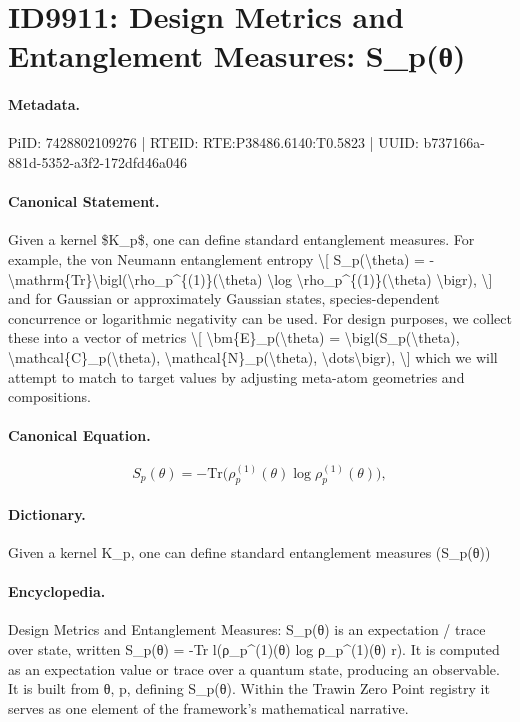 \section*{ID9911: Design Metrics and Entanglement Measures: S\_p(θ)}
\paragraph{Metadata.}
PiID: 7428802109276 | RTEID: RTE:P38486.6140:T0.5823 | UUID: b737166a-881d-5352-a3f2-172dfd46a046

\paragraph{Canonical Statement.}
Given a kernel \$K\_p\$, one can define standard entanglement measures. For example, the von Neumann entanglement entropy \textbackslash{}[ S\_p(\textbackslash{}theta) = -\textbackslash{}mathrm\{Tr\}\textbackslash{}bigl(\textbackslash{}rho\_p\textasciicircum{}\{(1)\}(\textbackslash{}theta) \textbackslash{}log \textbackslash{}rho\_p\textasciicircum{}\{(1)\}(\textbackslash{}theta) \textbackslash{}bigr), \textbackslash{}] and for Gaussian or approximately Gaussian states, species-dependent concurrence or logarithmic negativity can be used. For design purposes, we collect these into a vector of metrics \textbackslash{}[ \textbackslash{}bm\{E\}\_p(\textbackslash{}theta) = \textbackslash{}bigl(S\_p(\textbackslash{}theta), \textbackslash{}mathcal\{C\}\_p(\textbackslash{}theta), \textbackslash{}mathcal\{N\}\_p(\textbackslash{}theta), \textbackslash{}dots\textbackslash{}bigr), \textbackslash{}] which we will attempt to match to target values by adjusting meta-atom geometries and compositions.

\paragraph{Canonical Equation.}
\[
S_p(\theta) = -\mathrm{Tr}\bigl(\rho_p^{(1)}(\theta) \log \rho_p^{(1)}(\theta) \bigr),
\]

\paragraph{Dictionary.}
Given a kernel K\_p, one can define standard entanglement measures (S\_p(θ))

\paragraph{Encyclopedia.}
Design Metrics and Entanglement Measures: S\_p(θ) is an expectation / trace over state, written S\_p(θ) = -Tr l(ρ\_p\textasciicircum{}(1)(θ) log ρ\_p\textasciicircum{}(1)(θ) r). It is computed as an expectation value or trace over a quantum state, producing an observable. It is built from θ, p, defining S\_p(θ). Within the Trawin Zero Point registry it serves as one element of the framework's mathematical narrative.
